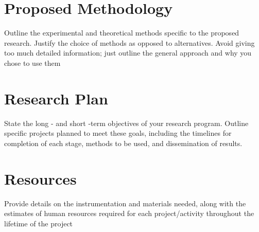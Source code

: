 \documentclass[12pt]{article}
\begin{document}
\section{Proposed Methodology}
Outline the experimental and theoretical methods specific to the proposed research. Justify the choice of methods as opposed to alternatives. Avoid giving too much detailed information; just outline the general approach and why you chose to use them

\section{Research Plan}
State the long - and short -term objectives of your research program. Outline specific projects planned to meet these goals, including the timelines for completion of each stage, methods to be used, and dissemination of results. 

\section{Resources}
Provide details on the instrumentation and materials needed, along with the estimates of human resources required for each project/activity throughout the lifetime of the project



\end{document}
